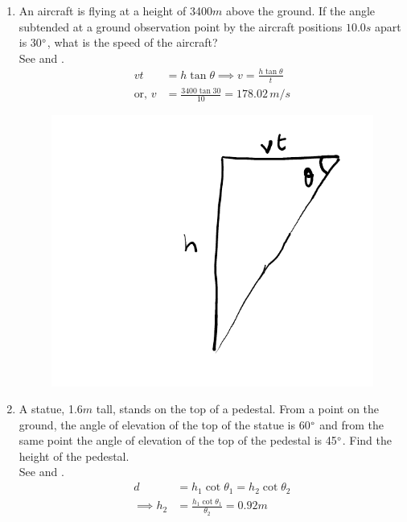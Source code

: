 \begin{enumerate}[label=\thesubsection.\arabic*.,ref=\thesubsection.\theenumi]
\item An aircraft is flying at a height of 3400$m$ above the ground. If the angle subtended at a ground observation point by the aircraft positions $10.0s$ apart is 30$\degree$, what is the speed of the aircraft?
%
	\\
	\solution
See 
and .	
\begin{align}
	vt &= h\tan\theta \implies v = \frac{h\tan\theta }{t}
	\\
	\text{or, } v &= \frac{3400 \tan 30}{10} = 178.02 \,m/s
\end{align}
\begin{table}[H]
\centering

\caption{}
\label{tab:ncert-1}	
\end{table}
\begin{figure}[H]
\centering
	\includegraphics[width=0.6\columnwidth]{figs/ncert/1.pdf}
\caption{}
\label{fig:ncert-1}	
\end{figure}
\item A statue, 1.6$m$ tall, stands on the top of a pedestal. From a point on the ground, the angle of elevation of the top of the statue is 60$\degree$ and from the same point the angle of elevation of the top of the pedestal is 45$\degree$. Find the height of the pedestal.
	\\
		\solution
See 
and .	
\begin{align}
	d &= h_1 \cot \theta_1
	= h_2 \cot \theta_2
	\\
	\implies
	h_2 &= 
	 \frac{h_1 \cot \theta_1}{\theta_2} =
	 0.92m
\end{align}
\begin{table}[H]
\centering

\caption{}
\label{tab:ncert-2}	

\end{table}
\end{enumerate}

